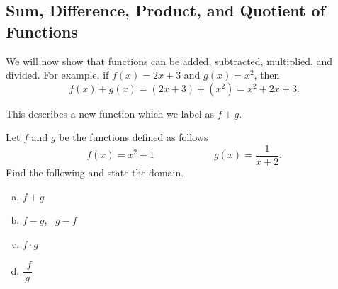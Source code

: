 \documentclass[oneside,10pt]{book}
\begin{document}
\newpage


\subsection{Sum, Difference, Product, and Quotient of Functions}

\example
We will now show that functions can be added, subtracted, multiplied, and
divided.
For example, if $f(x) = 2x+3$ and $g(x) = x^2 $, then
\[ f(x) + g(x) = (2x+3) + (x^2) = x^2 +2x + 3.\]

This describes a new function which we label as $f+g$.



\example
Let $f$ and $g$ be the functions defined as follows
\[ f(x) = x^2 -1 \hspace{1in} g(x) = \dfrac{1}{x+2}.\]
Find the following and state the domain.
\begin{enumerate}[(a)]
    \item
      $f+g$
    \item
      $f-g$, \, $g-f$
    \item
      $f\cdot g$
    \item
      $\dfrac{\phantom{i}f}{g}$
\end{enumerate}
\end{document}
